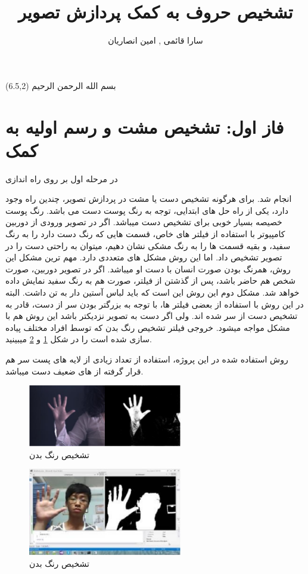 \documentclass[oneside]{article}
\title{تشخیص حروف به کمک پردازش تصویر}
\author{سارا قائمی , امین انصاریان }
\begin{document}
\maketitle\thispagestyle{empty}
\begin{textblock}{5}(6.5,2)\nastaliqfont
\noindent\Large
بسم الله الرحمن الرحیم
\end{textblock}

\section{فاز اول: تشخیص مشت و رسم اولیه به کمک 
}
در مرحله اول بر روی 
راه اندازی 

انجام شد. برای هرگونه تشخیص دست یا مشت در پردازش تصویر، چندین راه وجود دارد، يكی از راه حل های ابتدايی، توجه به رنگ پوست دست می باشد. رنگ پوست خصیصه بسیار خوبی برای تشخیص دست میباشد. اگر در تصویر ورودی از دوربین کامپیوتر با استفاده از فیلتر های خاص، قسمت هایی که رنگ دست دارد را به رنگ سفید، و بقیه قسمت ها را به رنگ مشکی نشان دهیم، میتوان به راحتی دست را در تصویر تشخیص داد. اما این روش مشکل های متعددی دارد. مهم ترین مشکل این روش، همرنگ بودن صورت انسان با دست او میباشد. اگر در تصویر دوربین، صورت شخص هم حاضر باشد، پس از گذشتن از فیلتر، صورت هم به رنگ سفید نمایش داده خواهد شد. مشکل دوم این روش این است که باید لباس آستین دار به تن داشت. البته در این روش با استفاده از بعضی فیلتر ها، با توجه به بزرگتر بودن سر از دست، قادر به تشخیص دست از سر شده اند. ولی اگر دست به تصویر نزدیکتر باشد این روش هم با مشکل مواجه میشود. خروجی فیلتر تشخیص رنگ بدن که توسط افراد مختلف پیاده سازی شده است را در  شکل
\ref{figHand1}
و
\ref{figHand2} 
میبینید.

روش استفاده شده در این پروژه، استفاده از تعداد زیادی از لایه های پست سر هم قرار گرفته از 
های ضعیف دست میباشد.
\begin{figure}
\centering
\includegraphics[width=0.6\textwidth]{Pictures/1.png}
\caption{تشخیص رنگ بدن}
\label{figHand1}
\end{figure}

\begin{figure}
\centering
\includegraphics[width=0.6\textwidth]{Pictures/2.png}
\caption{تشخیص رنگ بدن}
\label{figHand2}
\end{figure}
\end{document}
